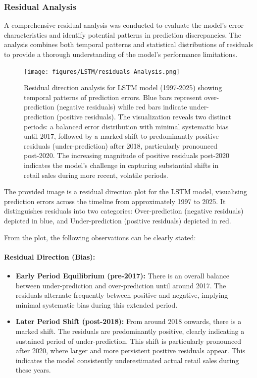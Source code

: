 \documentclass[12pt,a4paper]{report}
\begin{document}
\subsubsection{Residual Analysis}
A comprehensive residual analysis was conducted to evaluate the model's error characteristics and identify potential patterns in prediction discrepancies. The analysis combines both temporal patterns and statistical distributions of residuals to provide a thorough understanding of the model's performance limitations.

\begin{figure}[htbp]
\centering
\texttt{[image: figures/LSTM/residuals Analysis.png]}
\caption{Residual direction analysis for LSTM model (1997-2025) showing temporal patterns of prediction errors. Blue bars represent over-prediction (negative residuals) while red bars indicate under-prediction (positive residuals). The visualization reveals two distinct periods: a balanced error distribution with minimal systematic bias until 2017, followed by a marked shift to predominantly positive residuals (under-prediction) after 2018, particularly pronounced post-2020. The increasing magnitude of positive residuals post-2020 indicates the model's challenge in capturing substantial shifts in retail sales during more recent, volatile periods.}
\label{fig:residuals_tableau}
\end{figure}

The provided image is a residual direction plot for the LSTM model, visualising prediction errors across the timeline from approximately 1997 to 2025. It distinguishes residuals into two categories: Over-prediction (negative residuals) depicted in blue, and Under-prediction (positive residuals) depicted in red. 

From the plot, the following observations can be clearly stated: 
\paragraph{Residual Direction (Bias):} 
\begin{itemize}
    \item \textbf{Early Period Equilibrium (pre-2017):} There is an overall balance between under-prediction and over-prediction until around 2017. The residuals alternate frequently between positive and negative, implying minimal systematic bias during this extended period.
    
    \item \textbf{Later Period Shift (post-2018):} From around 2018 onwards, there is a marked shift. The residuals are predominantly positive, clearly indicating a sustained period of under-prediction. This shift is particularly pronounced after 2020, where larger and more persistent positive residuals appear. This indicates the model consistently underestimated actual retail sales during these years.
\end{itemize}
\end{document}
